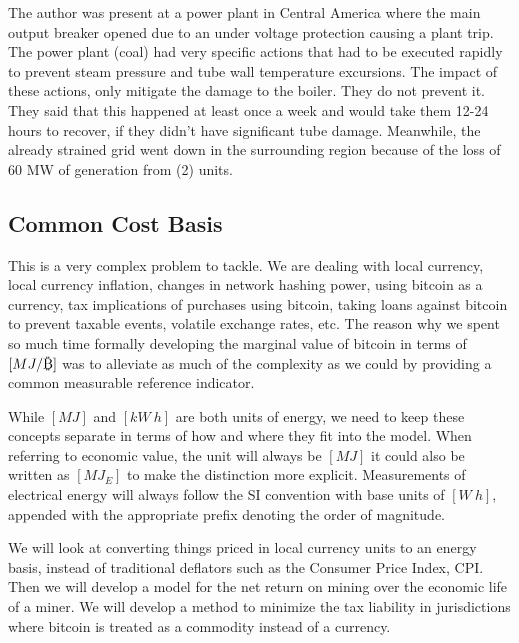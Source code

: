 \documentclass[runningheads]{llncs}
\def\bitcoin{
    \leavevmode
    \vtop{\offinterlineskip %
    \setbox0=\hbox{B}
    \setbox2=\hbox to\wd0{\hfil\hskip-.03em
    \vrule height .3ex width .15ex\hskip .08em
    \vrule height .3ex width .15ex\hfil}
    \vbox{\copy2\box0}\box2}
}
\begin{document}
The author was present at a power plant in Central America where the main output breaker opened due to an under voltage protection causing a plant trip.
The power plant (coal) had very specific actions that had to be executed rapidly to prevent steam pressure and tube wall temperature excursions.
The impact of these actions, only mitigate the damage to the boiler.
They do not prevent it.
They said that this happened at least once a week and would take them 12-24 hours to recover, if they didn't have significant tube damage.
Meanwhile, the already strained grid went down in the surrounding region because of the loss of 60 MW of generation from (2) units.

\subsection{Common Cost Basis}
This is a very complex problem to tackle.
We are dealing with local currency, local currency inflation, changes in network hashing power, using bitcoin as a currency, tax implications of purchases using bitcoin, taking loans against bitcoin to prevent taxable events, volatile exchange rates, etc.
The reason why we spent so much time formally developing the marginal value of bitcoin in terms of $[MJ/\bitcoin]$ was to alleviate as much of the complexity as we could by providing a common measurable reference indicator.

While $[MJ]$ and $[kW~h]$ are both units of energy, we need to keep these concepts separate in terms of how and where they fit into the model.
When referring to economic value, the unit will always be $[MJ]$ it could also be written as $[MJ_E]$ to make the distinction more explicit.
Measurements of electrical energy will always follow the SI convention with base units of $[W~h]$, appended with the appropriate prefix denoting the order of magnitude.

We will look at converting things priced in local currency units to an energy basis, instead of traditional deflators such as the Consumer Price Index, CPI.
Then we will develop a model for the net return on mining over the economic life of a miner.
We will develop a method to minimize the tax liability in jurisdictions where bitcoin is treated as a commodity instead of a currency.

\end{document}
